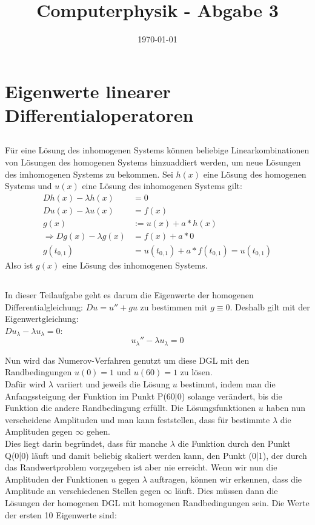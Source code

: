 \documentclass[ngerman]{scrartcl}
\title{Computerphysik - Abgabe 3}
\date{\today}
\begin{document}
\setcounter{section}{6}
\thispagestyle{fancy}

\section{Eigenwerte linearer Differentialoperatoren}
\subsection{}
Für eine Lösung des inhomogenen Systems können beliebige Linearkombinationen von Lösungen
des homogenen Systems hinzuaddiert werden, um neue Lösungen des imhomogenen Systems zu bekommen.
Sei $h(x)$ eine Lösung des homogenen Systems und $u(x)$ eine Lösung des inhomogenen Systems gilt:
\begin{align*}
	Dh(x)-\lambda h(x)&=0\\
	Du(x)-\lambda u(x)&=f(x)\\
	g(x) &:= u(x)+a*h(x)\\
	\Rightarrow Dg(x)-\lambda g(x) &= f(x)+a*0\\
	g(t_{0,1}) &= u(t_{0,1})+a*f(t_{0,1}) = u(t_{0,1}) 
\end{align*}
Also ist $g(x)$ eine Lösung des inhomogenen Systems.


\subsection{}
In dieser Teilaufgabe geht es darum die Eigenwerte der homogenen Differentialgleichung: $Du = u'' + gu$ zu bestimmen mit $g \equiv 0$. Deshalb gilt mit der Eigenwertgleichung:\\ $ D u_{\lambda} - \lambda u_{\lambda} = 0$:
\begin{equation*}
	u_{\lambda}'' - \lambda u_{\lambda} = 0
\end{equation*}

Nun wird das Numerov-Verfahren genutzt um diese DGL mit den Randbedingungen $u(0)=1$ und $u(60)=1$ zu lösen. \\
Dafür wird $\lambda$ variiert und jeweils die Lösung $u$ bestimmt, indem man die Anfangssteigung der Funktion im Punkt P(60|0) solange verändert, bis die Funktion die andere Randbedingung erfüllt. Die Lösungsfunktionen $u$ haben nun verscheidene Amplituden und man kann feststellen, dass für bestimmte $\lambda$ die Amplituden gegen $\infty$ gehen.\\
Dies liegt darin begründet, dass für manche $\lambda$ die Funktion durch den Punkt Q(0|0) läuft und damit beliebig skaliert werden kann, den Punkt (0|1), der durch das Randwertproblem vorgegeben ist aber nie erreicht. Wenn wir nun die Amplituden der Funktionen $u$ gegen $\lambda$ auftragen, können wir erkennen, dass die Amplitude an verschiedenen Stellen gegen $\infty$ läuft. Dies müssen dann die Lösungen der homogenen DGL mit homogenen Randbedingungen sein. Die Werte der ersten 10 Eigenwerte sind:
\end{document}
